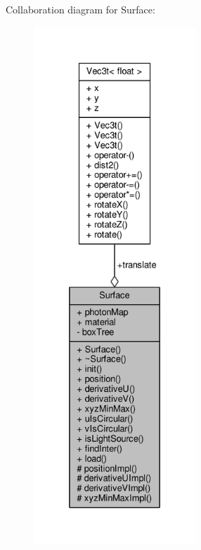 Collaboration diagram for Surface\+:
\nopagebreak
\begin{figure}[H]
\begin{center}
\leavevmode
\includegraphics[height=550pt]{classSurface__coll__graph}
\end{center}
\end{figure}
